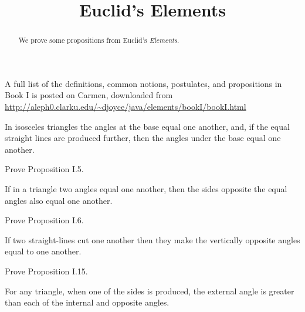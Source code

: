 \documentclass{ximera}
\title{Euclid's Elements}
\begin{document}
\begin{abstract}
We prove some propositions from Euclid's \textit{Elements}. \end{abstract}

\maketitle



A full list of the definitions, common notions, postulates, and propositions in Book I is posted on Carmen, downloaded from \url{http://aleph0.clarku.edu/~djoyce/java/elements/bookI/bookI.html}


\begin{proposition}[I.5]
In isosceles triangles the angles at the base equal one another, and, if the equal straight lines are produced further, then the angles under the base equal one another.
\end{proposition}

\begin{question}
Prove Proposition I.5.
\end{question}

\begin{proposition}[I.6]
If in a triangle two angles equal one another, then the sides opposite the equal angles also equal one another.
\end{proposition}

\begin{question}
Prove Proposition I.6.
\end{question}


\begin{proposition}[I.15]
If two straight-lines cut one another then they make the vertically
opposite angles equal to one another.
\end{proposition}

\begin{question}
Prove Proposition I.15.
\end{question}

\begin{proposition}[I.16]
For any triangle, when one of the sides is produced, the external
angle is greater than each of the internal and opposite angles.
\begin{image}
\end{image}
\end{proposition}
\end{document}
